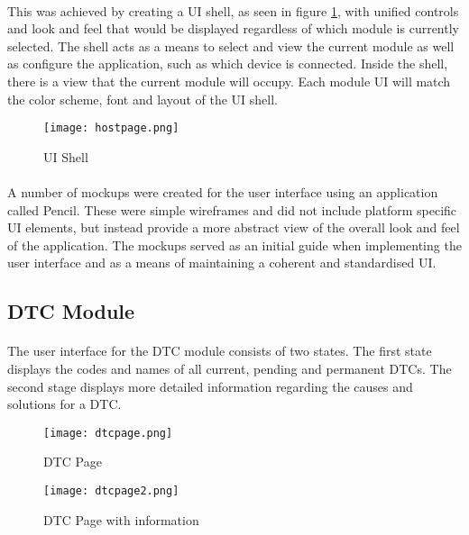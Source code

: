 	\paragraph{}{
	This was achieved by creating a UI shell, as seen in figure \ref{fig:UIShell}, with unified controls and look and feel that would be displayed regardless of which module is currently selected. The shell acts as a means to select and view the current module as well as configure the application, such as which device is connected. Inside the shell, there is a view that the current module will occupy. Each module UI will match the color scheme, font and layout of the UI shell.
	}
	
	\begin{figure}[h]
		\begin{center}
			\texttt{[image: hostpage.png]}
			\caption{UI Shell}
			\label{fig:UIShell}
		\end{center}
	\end{figure}	
	\newpage
	\paragraph{}{
	A number of mockups were created for the user interface using an application called Pencil. These were simple wireframes and did not include platform specific UI elements, but instead provide a more abstract view of the overall look and feel of the application. The mockups served as an initial guide when implementing the user interface and as a means of maintaining a coherent and standardised UI. 
	}
	
	\subsection{DTC Module}
		\paragraph{}{						
		The user interface for the DTC module consists of two states. The first state displays the codes and names of all current, pending and permanent DTCs. The second stage displays more detailed information regarding the causes and solutions for a DTC.
		}
		
		\begin{figure}[h]
			\begin{center}								
				\begin{minipage}{0.49\textwidth}
					\texttt{[image: dtcpage.png]}
					\caption{DTC Page}						
					\label{fig:DTCPage1}
				\end{minipage}
				\hfill			
				\begin{minipage}{0.49\textwidth}
					\texttt{[image: dtcpage2.png]}
					\caption{DTC Page with information}						
					\label{fig:DTCPage2}
				\end{minipage}									
			\end{center}
		\end{figure}
		
